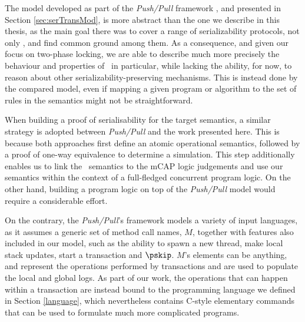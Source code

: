 	The model developed as part of the \textit{Push/Pull} framework \cite{pushPull}, and presented in Section \ref{sec:serTransMod}, is more abstract than the one we describe in this thesis, as the main goal there was to cover a range of serializability protocols, not only \tpl, and find common ground among them. As a consequence, and given our focus on two-phase locking, we are able to describe much more precisely the behaviour and properties of \tpl\ in particular, while lacking the ability, for now, to reason about other serializability-preserving mechanisms. This is instead done by the compared model, even if mapping a given program or algorithm to the set of rules in the semantics might not be straightforward.
	
	When building a proof of serialisability for the target semantics, a similar strategy is adopted between \textit{Push/Pull} and the work presented here. This is because both approaches first define an atomic operational semantics, followed by a proof of one-way equivalence to determine a simulation. This step additionally enables us to link the \tpl\ semantics to the mCAP logic judgements and use our semantics within the context of a full-fledged concurrent program logic. On the other hand, building a program logic on top of the \textit{Push/Pull} model would require a considerable effort.
	
	On the contrary, the \textit{Push/Pull}'s framework models a variety of input languages, as it assumes a generic set of method call names, $M$, together with features also included in our model, such as the ability to spawn a new thread, make local stack updates, start a transaction and $\pskip$. $M$'s elements can be anything, and represent the operations performed by transactions and are used to populate the local and global logs. As part of our work, the operations that can happen within a transaction are instead bound to the programming language we defined in Section \ref{language}, which nevertheless contains C-style elementary commands that can be used to formulate much more complicated programs.
	
